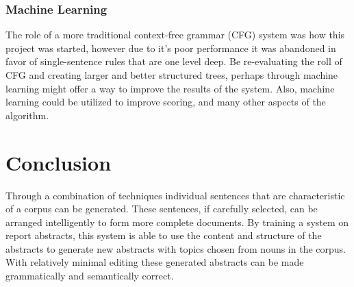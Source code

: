 \documentclass[letterpaper, 10 pt, conference]{ieeeconf}  %
\begin{document}
\subsubsection{Machine Learning}

The role of a more traditional context-free grammar (CFG) system was how this project was started, however due to it's poor performance it was abandoned in favor of single-sentence rules that are one level deep. Be re-evaluating the roll of CFG and creating larger and better structured trees, perhaps through machine learning might offer a way to improve the results of the system. Also, machine learning could be utilized to improve scoring, and many other aspects of the algorithm.

\section{Conclusion}

Through a combination of techniques individual sentences that are characteristic of a corpus can be generated. These sentences, if carefully selected, can be arranged intelligently to form more complete documents. By training a system on report abstracts, this system is able to use the content and structure of the abstracts to generate new abstracts with topics chosen from nouns in the corpus. With relatively minimal editing these generated abstracts can be made grammatically and semantically correct.

\addtolength{\textheight}{-12cm}   %







\end{document}

